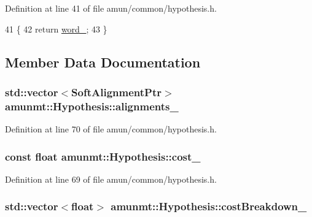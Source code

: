 Definition at line 41 of file amun/common/hypothesis.\+h.


\begin{DoxyCode}
41                            \{
42       \textcolor{keywordflow}{return} \hyperlink{classamunmt_1_1Hypothesis_a4122e8c47d3f68c1fb265ada42d4b891}{word\_};
43     \}
\end{DoxyCode}


\subsection{Member Data Documentation}
\subsubsection[{\texorpdfstring{alignments\+\_\+}{alignments_}}]{\setlength{\rightskip}{0pt plus 5cm}std\+::vector$<${\bf Soft\+Alignment\+Ptr}$>$ amunmt\+::\+Hypothesis\+::alignments\+\_\+\hspace{0.3cm}{\ttfamily [private]}}\hypertarget{classamunmt_1_1Hypothesis_a24d44880704ea81826ada294952655f9}{}\label{classamunmt_1_1Hypothesis_a24d44880704ea81826ada294952655f9}


Definition at line 70 of file amun/common/hypothesis.\+h.

\subsubsection[{\texorpdfstring{cost\+\_\+}{cost_}}]{\setlength{\rightskip}{0pt plus 5cm}const float amunmt\+::\+Hypothesis\+::cost\+\_\+\hspace{0.3cm}{\ttfamily [private]}}\hypertarget{classamunmt_1_1Hypothesis_acfd13eed3a596225b5b75c4d2a605942}{}\label{classamunmt_1_1Hypothesis_acfd13eed3a596225b5b75c4d2a605942}


Definition at line 69 of file amun/common/hypothesis.\+h.

\subsubsection[{\texorpdfstring{cost\+Breakdown\+\_\+}{costBreakdown_}}]{\setlength{\rightskip}{0pt plus 5cm}std\+::vector$<$float$>$ amunmt\+::\+Hypothesis\+::cost\+Breakdown\+\_\+\hspace{0.3cm}{\ttfamily [private]}}\hypertarget{classamunmt_1_1Hypothesis_adca2a81f352db1d68d0a43a2d95623eb}{}\label{classamunmt_1_1Hypothesis_adca2a81f352db1d68d0a43a2d95623eb}


